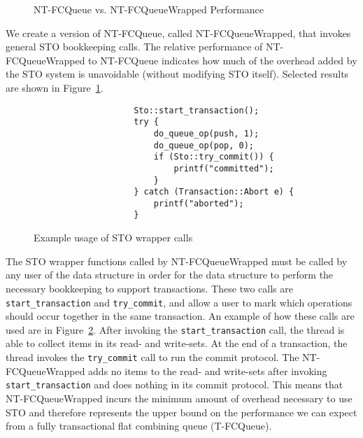 \begin{figure}[H]
    \centering
	\begin{minipage}{0.75\textwidth}
        \caption*{Push-Pop Test (2 threads)}
        \vspace{12pt}
	\end{minipage}
   	\begin{minipage}{0.75\textwidth}
        \caption*{Multi-Thread Singletons Test}
	\end{minipage}
        \caption{NT-FCQueue vs. NT-FCQueueWrapped Performance}
    \label{fig:wrappedqs}
\end{figure}

We create a version of NT-FCQueue, called NT-FCQueueWrapped, that invokes general STO bookkeeping calls. The relative performance of NT-FCQueueWrapped to NT-FCQueue indicates how much of the overhead added by the STO system is unavoidable (without modifying STO itself). 
Selected results are shown in Figure~\ref{fig:wrappedqs}.

\begin{figure}[t]
\centering
\singlespace
{}
	\begin{lstlisting}
                    Sto::start_transaction();
                    try {
                        do_queue_op(push, 1);
                        do_queue_op(pop, 0);
                        if (Sto::try_commit()) {
                            printf("committed");
                        }
                    } catch (Transaction::Abort e) {
                        printf("aborted");
                    }
	\end{lstlisting}
\caption{Example usage of STO wrapper calls}
\label{fig:wrappers}
\end{figure}

The STO wrapper functions called by NT-FCQueueWrapped must be called by any user of the data structure in order for the data structure to perform the necessary bookkeeping to support transactions.
These two calls are \texttt{start\_transaction} and \texttt{try\_commit}, and allow a user to mark which operations should occur together in the same transaction. An example of how these calls are used are in Figure~\ref{fig:wrappers}. After invoking the \texttt{start\_transaction} call, the thread is able to collect items in its read- and write-sets. At the end of a transaction, the thread invokes the \texttt{try\_commit} call to run the commit protocol. The NT-FCQueueWrapped adds no items to the read- and write-sets after invoking \texttt{start\_transaction} and does nothing in its commit protocol. This means that NT-FCQueueWrapped incurs the minimum amount of overhead necessary to use STO and therefore represents the upper bound on the performance we can expect from a fully transactional flat combining queue (T-FCQueue). 


